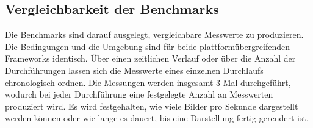 \subsection{Vergleichbarkeit der Benchmarks}

Die Benchmarks sind darauf ausgelegt, vergleichbare Messwerte zu produzieren. Die Bedingungen und die Umgebung sind für beide plattformübergreifenden Frameworks identisch. Über einen zeitlichen Verlauf oder über die Anzahl der Durchführungen lassen sich die Messwerte eines einzelnen Durchlaufs chronologisch ordnen. Die Messungen werden insgesamt 3 Mal durchgeführt, wodurch bei jeder Durchführung eine festgelegte Anzahl an Messwerten produziert wird. Es wird festgehalten, wie viele Bilder pro Sekunde dargestellt werden können oder wie lange es dauert, bis eine Darstellung fertig gerendert ist. 


